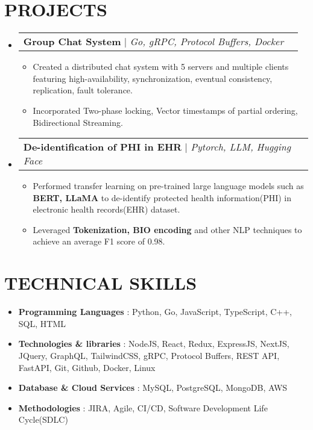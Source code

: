 \documentclass[letterpaper,10.9pt]{article}
\makeatletter
\newcommand{\resumeItem}[1]{
  \item\small{
    {#1 \vspace{-2pt}}
  }
}
\newcommand{\resumeskill}[2]{
\item 
      \textbf{ \small #1} \small : {\small #2}  \vspace{-5pt}\\
}
\newcommand{\resumeProjectHeading}[3]{
    \vspace{-2pt}\item
    \begin{tabular*}{1\textwidth}{l@{\extracolsep{\fill}}r}
      {\small #1}  {\small #2} | {\small #3}\\
    \end{tabular*}\vspace{-5pt}
}
\newcommand{\resumeSubHeadingListStart}{\begin{itemize}[leftmargin=0.0in, label={}]}
\newcommand{\resumeSubHeadingListEnd}{\end{itemize}}
\newcommand{\resumeItemListStart}{\begin{itemize}}
\newcommand{\resumeItemListEnd}{\end{itemize}\vspace{-7pt}}
\makeatother
\begin{document}
\section{PROJECTS}
    \resumeSubHeadingListStart
            \resumeProjectHeading
             {\textbf{Group Chat System}}{\href{https://github.com/CS2510-Distributed-Systems/Advanced-Group-Chat-System}{\faGithub}}{\emph{Go, gRPC, Protocol Buffers, Docker}}
                \resumeItemListStart
                        \resumeItem{Created a distributed chat system with 5 servers and multiple clients featuring high-availability, synchronization, eventual consistency, replication, fault tolerance.}
                        \resumeItem{Incorporated Two-phase locking, Vector timestamps of partial ordering, Bidirectional Streaming.}
              		\resumeItemListEnd
            \resumeProjectHeading
             {\textbf{De-identification of PHI in EHR}}{\href{https://github.com/dilipteja1/de-identification-of-PHI-in-Electronics-Health-Records.-/tree/main}{\faGithub}}{\emph{Pytorch, LLM, Hugging Face}}
          		    \resumeItemListStart
                            \resumeItem{Performed transfer learning on pre-trained large language models such as \textbf{BERT, LLaMA} to de-identify protected health information(PHI) in electronic health records(EHR) dataset.}
                            \resumeItem{Leveraged \textbf{Tokenization, BIO encoding} and other NLP techniques to achieve an average F1 score of 0.98.}
                        \resumeItemListEnd
            
    \resumeSubHeadingListEnd

\section{TECHNICAL SKILLS}
    \resumeSubHeadingListStart
        \resumeskill{Programming Languages}{Python, Go, JavaScript, TypeScript, C++, SQL, HTML}
        \resumeskill{Technologies \& libraries}{NodeJS, React, Redux, ExpressJS, NextJS, JQuery, GraphQL, TailwindCSS, gRPC, Protocol Buffers, REST API, FastAPI,  Git, Github, Docker, Linux }
        \resumeskill{Database \& Cloud Services}{MySQL, PostgreSQL, MongoDB, AWS}
        \resumeskill{Methodologies}{JIRA, Agile, CI/CD, Software Development Life Cycle(SDLC)}
    \resumeSubHeadingListEnd
    
\end{document}
